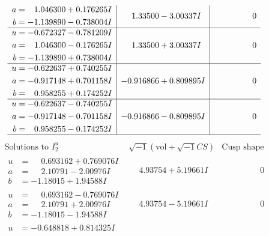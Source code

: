 \documentclass[1p]{elsarticle_modified}
\theoremstyle{definition}
\newcommand{\I}{\sqrt{-1}}
\begin{document}
$$\begin{array}{c|c|c}
\begin{aligned}
a &= \phantom{-}1.046300 + 0.176265 I \\
b &= -1.139890 - 0.738004 I\end{aligned}
 & \phantom{-}1.33500 - 3.00337 I & \phantom{-0.000000 } 0 \\ \hline\begin{aligned}
u &= -0.672327 - 0.781209 I \\
a &= \phantom{-}1.046300 - 0.176265 I \\
b &= -1.139890 + 0.738004 I\end{aligned}
 & \phantom{-}1.33500 + 3.00337 I & \phantom{-0.000000 } 0 \\ \hline\begin{aligned}
u &= -0.622637 + 0.740255 I \\
a &= -0.917148 + 0.701158 I \\
b &= \phantom{-}0.958255 + 0.174252 I\end{aligned}
 & -0.916866 + 0.809895 I & \phantom{-0.000000 } 0 \\ \hline\begin{aligned}
u &= -0.622637 - 0.740255 I \\
a &= -0.917148 - 0.701158 I \\
b &= \phantom{-}0.958255 - 0.174252 I\end{aligned}
 & -0.916866 - 0.809895 I & \phantom{-0.000000 } 0\\
 \hline 
 \end{array}$$\newpage$$\begin{array}{c|c|c}  
\text{Solutions to }I^u_{2}& \I (\text{vol} + \sqrt{-1}CS) & \text{Cusp shape}\\
 \hline 
\begin{aligned}
u &= \phantom{-}0.693162 + 0.769076 I \\
a &= \phantom{-}2.10791 - 2.00976 I \\
b &= -1.18015 + 1.94588 I\end{aligned}
 & \phantom{-}4.93754 + 5.19661 I & \phantom{-0.000000 } 0 \\ \hline\begin{aligned}
u &= \phantom{-}0.693162 - 0.769076 I \\
a &= \phantom{-}2.10791 + 2.00976 I \\
b &= -1.18015 - 1.94588 I\end{aligned}
 & \phantom{-}4.93754 - 5.19661 I & \phantom{-0.000000 } 0 \\ \hline\begin{aligned}
u &= -0.648818 + 0.814325 I \\

\end{aligned}
\end{array}$$
\end{document}
